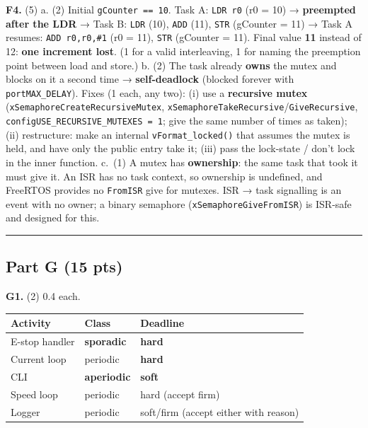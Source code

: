 \documentclass[
  11pt,
]{article}
\newcounter{none} %
\begin{document}
\textbf{F4.} (5) a. (2) Initial \texttt{gCounter\ ==\ 10}. Task A:
\texttt{LDR\ r0} (r0 = 10) → \textbf{preempted after the LDR} → Task B:
\texttt{LDR} (10), \texttt{ADD} (11), \texttt{STR} (gCounter = 11) →
Task A resumes: \texttt{ADD\ r0,r0,\#1} (r0 = 11), \texttt{STR}
(gCounter = 11). Final value \textbf{11} instead of 12: \textbf{one
increment lost}. (1 for a valid interleaving, 1 for naming the
preemption point between load and store.) b. (2) The task already
\textbf{owns} the mutex and blocks on it a second time →
\textbf{self-deadlock} (blocked forever with \texttt{portMAX\_DELAY}).
Fixes (1 each, any two): (i) use a \textbf{recursive mutex}
(\texttt{xSemaphoreCreateRecursiveMutex},
\texttt{xSemaphoreTakeRecursive}/\texttt{GiveRecursive},
\texttt{configUSE\_RECURSIVE\_MUTEXES\ =\ 1}; give the same number of
times as taken); (ii) restructure: make an internal
\texttt{vFormat\_locked()} that assumes the mutex is held, and have only
the public entry take it; (iii) pass the lock-state / don't lock in the
inner function. c.~(1) A mutex has \textbf{ownership}: the same task
that took it must give it. An ISR has no task context, so ownership is
undefined, and FreeRTOS provides no \texttt{FromISR} give for mutexes.
ISR → task signalling is an event with no owner; a binary semaphore
(\texttt{xSemaphoreGiveFromISR}) is ISR-safe and designed for this.

\begin{center}\rule{0.5\linewidth}{0.5pt}\end{center}

\subsection{Part G (15 pts)}\label{part-g-15-pts}

\textbf{G1.} (2) 0.4 each.

{\def\LTcaptype{none} %
\begin{longtable}[]{@{}lll@{}}
\toprule\noalign{}
Activity & Class & Deadline \\
\midrule\noalign{}
\endhead
\bottomrule\noalign{}
\endlastfoot
E-stop handler & \textbf{sporadic} & \textbf{hard} \\
Current loop & periodic & \textbf{hard} \\
CLI & \textbf{aperiodic} & \textbf{soft} \\
Speed loop & periodic & hard (accept firm) \\
Logger & periodic & soft/firm (accept either with reason) \\
\end{longtable}
}
\end{document}
